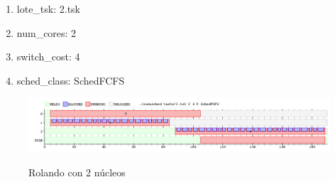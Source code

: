 \begin{enumerate}
	\item lote\_tsk: 2.tsk
	\item num\_cores: 2
	\item switch\_cost: 4
	\item sched\_class: SchedFCFS
\end{enumerate}

\begin{figure}[h]
    \includegraphics[width=\linewidth]{images/2_2nucleos.png}
    \label{fig:Task Consola}
    \caption{Rolando con 2 núcleos}
\end{figure}


